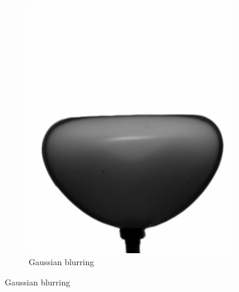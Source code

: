 \begin{figure}[H]
\begin{subfigure}[h]{0.48\textwidth}
        \includegraphics[width=\linewidth]{figures/Chapter_1/gaussian_b.png}%
        \caption{Gaussian blurring}%
        \label{fig:gaussian_f}%
    \end{subfigure}%
		

\end{figure}
